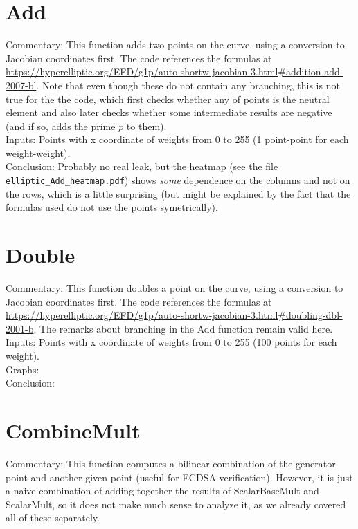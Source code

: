 \documentclass[a4paper]{scrartcl}
\begin{document}

\section{Add}
Commentary: This function adds two points on the curve, using a conversion to Jacobian coordinates first. The code references the formulas at \url{https://hyperelliptic.org/EFD/g1p/auto-shortw-jacobian-3.html#addition-add-2007-bl}. Note that even though these do not contain any branching, this is not true for the the code, which first checks whether any of points is the neutral element and also later checks whether some intermediate results are negative (and if so, adds the prime $p$ to them).
\\Inputs: Points with x coordinate of weights from 0 to 255 (1 point-point for each weight-weight).
\\Conclusion: Probably no real leak, but the heatmap (see the file \verb+elliptic_Add_heatmap.pdf+) shows \textit{some} dependence on the columns and not on the rows, which is a little surprising (but might be explained by the fact that the formulas used do not use the points symetrically).

\iffalse
\section{Double}
Commentary: This function doubles a point on the curve, using a conversion to Jacobian coordinates first. The code references the formulas at \url{https://hyperelliptic.org/EFD/g1p/auto-shortw-jacobian-3.html#doubling-dbl-2001-b}. The remarks about branching in the Add function remain valid here.
\\Inputs: Points with x coordinate of weights from 0 to 255 (100 points for each weight).
\\Graphs:
\\Conclusion:


\section{CombineMult}
Commentary: This function computes a bilinear combination of the generator point and another given point (useful for ECDSA verification). However, it is just a naive combination of adding together the results of ScalarBaseMult and ScalarMult, so it does not make much sense to analyze it, as we already covered all of these separately.
\end{document}
